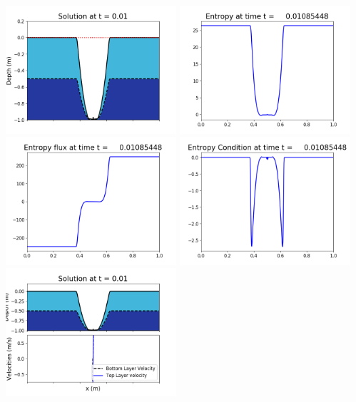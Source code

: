 \documentclass[11pt]{article}
\begin{document}
\includegraphics[width=0.475\textwidth]{frame0068fig1006.png}
\vskip 10pt 
\includegraphics[width=0.475\textwidth]{frame0068fig1007.png}
\includegraphics[width=0.475\textwidth]{frame0068fig1008.png}
\vskip 10pt 
\includegraphics[width=0.475\textwidth]{frame0068fig1009.png}
\vskip 10pt 
\includegraphics[width=0.475\textwidth]{frame0069fig1001.png}
\end{document}
